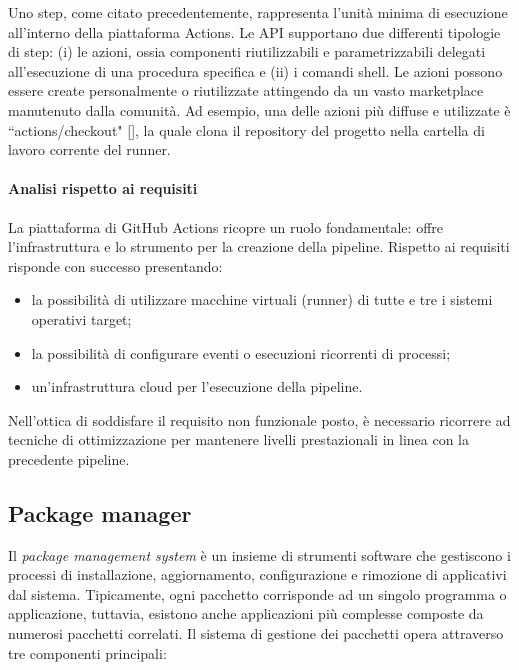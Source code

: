 
Uno step, come citato precedentemente, rappresenta l'unità minima di esecuzione all'interno della piattaforma Actions. Le API supportano due differenti tipologie di step: (i) le azioni, ossia componenti riutilizzabili e parametrizzabili delegati all'esecuzione di una procedura specifica e (ii) i comandi shell. Le azioni possono essere create personalmente o riutilizzate attingendo da un vasto marketplace manutenuto dalla comunità.  Ad esempio, una delle azioni più diffuse e utilizzate è ``actions/checkout" [\cite{github-actions-diffusion}], la quale clona il repository del progetto nella cartella di lavoro corrente del runner.

\paragraph{Analisi rispetto ai requisiti}

La piattaforma di GitHub Actions ricopre un ruolo fondamentale: offre l'infrastruttura e lo strumento per la creazione della pipeline. Rispetto ai requisiti risponde con successo presentando:
\begin{itemize}
	\item la possibilità di utilizzare macchine virtuali (runner) di tutte e tre i sistemi operativi target;
	\item la possibilità di configurare eventi o esecuzioni ricorrenti di processi;
	\item un'infrastruttura cloud per l'esecuzione della pipeline.
\end{itemize}
Nell'ottica di soddisfare il requisito non funzionale posto, è necessario ricorrere ad tecniche di ottimizzazione per mantenere livelli prestazionali in linea con la precedente pipeline.

\subsection{Package manager}

Il \textit{package management system} è un insieme di strumenti software che gestiscono i processi di installazione, aggiornamento, configurazione e rimozione di applicativi dal sistema. Tipicamente, ogni pacchetto corrisponde ad un singolo programma o applicazione, tuttavia, esistono anche applicazioni più complesse composte da numerosi pacchetti correlati. Il sistema di gestione dei pacchetti opera attraverso tre componenti principali:

